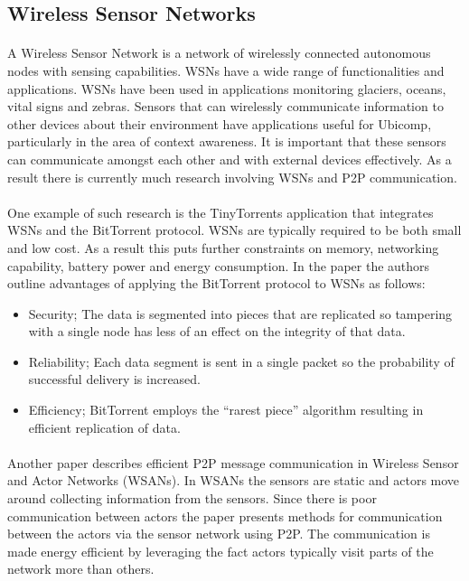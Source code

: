 \documentclass[11pt]{amsart}
\begin{document}
\subsection{Wireless Sensor Networks}
\paragraph{}
A Wireless Sensor Network is a network of wirelessly connected autonomous nodes with sensing capabilities. WSNs have a wide range of functionalities and applications. WSNs have been used in applications monitoring glaciers, oceans, vital signs and zebras.\cite{DesignSpace} Sensors that can wirelessly communicate information to other devices about their environment have applications useful for Ubicomp, particularly in the area of context awareness. It is important that these sensors can communicate amongst each other and with external devices effectively. As a result there is currently much research involving WSNs and P2P communication.
\paragraph{}
One example of such research is the TinyTorrents\cite{TinyTorrents} application that integrates WSNs and the BitTorrent protocol. WSNs are typically required to be both small and low cost. As a result this puts further constraints on memory, networking capability, battery power and energy consumption. In the paper the authors outline advantages of applying the BitTorrent protocol to WSNs as follows:
\begin{itemize}
  \item Security; The data is segmented into pieces that are replicated so tampering with a single node has less of an effect on the integrity of that data. 
  \item Reliability; Each data segment is sent in a single packet so the probability of successful delivery is increased.
  \item Efficiency; BitTorrent employs the ``rarest piece'' algorithm resulting in efficient replication of data.
\end{itemize}
\paragraph{}
Another paper describes efficient P2P message communication in Wireless Sensor and Actor Networks (WSANs). In WSANs the sensors are static and actors move around collecting information from the sensors. Since there is poor communication between actors the paper presents methods for communication between the actors via the sensor network using P2P. The communication is made energy efficient by leveraging the fact actors typically visit parts of the network more than others.\cite{EMD}
\end{document}
